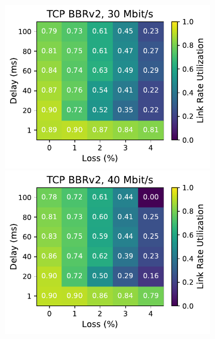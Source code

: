 \begin{figure}[ht]
\begin{subfigure}[b]{0.22\linewidth}
        \includegraphics[width=\linewidth,trim={0 0 2cm 0},clip]{splitting/figures/heatmaps/heatmap_tcp_bbr2_30mbps.pdf}
        \includegraphics[width=\linewidth,trim={0 0 2cm 0},clip]{splitting/figures/heatmaps/heatmap_tcp_bbr2_40mbps.pdf}

\end{subfigure}
\end{figure}

